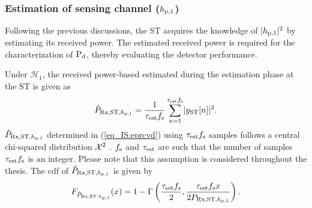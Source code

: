 \subsubsection{Estimation of sensing channel ($h_{\text{p,1}}$)}
Following the previous discussions, the ST acquires the knowledge of $|h_{\text{p,1}}|^2$ by estimating its received power. The estimated received power is required for the characterization of $\text{P}_{\text{d}}$, thereby evaluating the detector performance. %

Under $\mathcal H_1$, the received power-based estimated during the estimation phase at the ST is given as \cite{Urkowitz} 
\begin{align}
\hat{P}_{\text{Rx,ST,$h_{\text{p,1}}$}} = {\frac{1}{{\tau_{\text{est}} f_{\text{s}}}}\sum_{n=1}^{\tau_{\text{est}} f_{\text{s}}}} { |y_{\text{ST}}[n]|^2}.
\label{eq_IS:eprcvd} 
\end{align}
$\hat{P}_{\text{Rx,ST,$h_{\text{p,1}}$}}$ determined in (\ref{eq_IS:eprcvd}) using $\tau_{\text{est}} f_{\text{s}}$ samples follows a central chi-squared distribution $\cchi2$ \cite{Kay}. $f_{\text{s}}$ and $\tau_{\text{est}}$ are such that the number of samples $\tau_{\text{est}} f_{\text{s}}$ is an integer. Please note that this assumption is considered throughout the thesis. 
The cdf of $\hat{P}_{\text{Rx,ST,$h_{\text{p,1}}$}}$ is given by  
\begin{align}
F_{\hat{P}_{\text{Rx,ST,$h_{\text{p,1}}$}}}(x) = 1 - \Gamma\left(\frac{\tau_{\text{est}} f_{\text{s}}}{2}, \frac{ \tau_{\text{est}} f_{\text{s}} x}{2 P_{\text{Rx,ST,$h_{\text{p,1}}$}}}  \right). 
\label{eq_IS:dprcvd}
\end{align}


